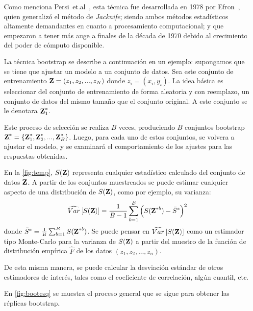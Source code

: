 Como menciona Persi~et.al~\cite{Diaconis1983}, esta técnica fue desarrollada en 1978 por Efron~\cite{Efron1978}, quien generalizó el método de \textit{Jacknife}; siendo ambos métodos estadísticos altamente demandantes en cuanto a procesamiento computacional; y que empezaron a tener más auge a finales de la década de 1970 debido al crecimiento del poder de cómputo disponible.

La técnica bootstrap se describe a continuación en un ejemplo: supongamos que se tiene que ajustar un modelo a un conjunto de datos. Sea este conjunto de entrenamiento $\textbf{Z} = (z_1, z_2, ..., z_N)$ donde $z_i = (x_i, y_i)$. La idea básica es seleccionar del conjunto de entrenamiento de forma aleatoria y con reemplazo, un conjunto de datos del mismo tamaño que el conjunto original. A este conjunto se le denotara $\textbf{Z}^{*}_1$.

Este proceso de selección se realiza $B$ veces, produciendo $B$ conjuntos bootstrap 
$\textbf{Z}^{*}_{\cdot} = \lbrace \textbf{Z}^{*}_1, \textbf{Z}^{*}_2, ..., \textbf{Z}^{*}_B \rbrace$. Luego, para cada uno de estos conjuntos, se volvera a ajustar el modelo, y se examinará el comportamiento de los ajustes para las respuestas obtenidas.

En la \autoref{fig:temp}, $S(\textbf{Z})$ representa cualquier estadístico calculado del conjunto de datos $\textbf{Z}$. A partir de los conjuntos muestreados se puede estimar cualquier aspecto de una distribución de $S(\textbf{Z})$, como por ejemplo, su varianza: 
\begin{equation}
\widehat{Var} \left[ S(\textbf{Z}) \right] = \frac{1}{B-1} \sum_{b=1}^B \left( S(\textbf{Z}^{*b}) - \bar{S}^{*} \right)^2
\end{equation}
donde $\bar{S}^{*} = \frac{1}{B} \sum_{b=1}^B S(\textbf{Z}^{*b})$. Se puede pensar en $\widehat{Var} \left[ S(\textbf{Z}) \right]$ como un estimador tipo Monte-Carlo para la varianza de $S(\textbf{Z})$ a partir del muestro de la función de distribución empírica $\widehat{F}$ de los datos $(z_1, z_2, ..., z_n)$. 

De esta misma manera, se puede calcular la desviación estándar de otros estimadores de interés, tales como el coeficiente de correlación, algún cuantil, etc.

En \autoref{fig:bootesq} se muestra el proceso general que se sigue para obtener las réplicas bootstrap.

